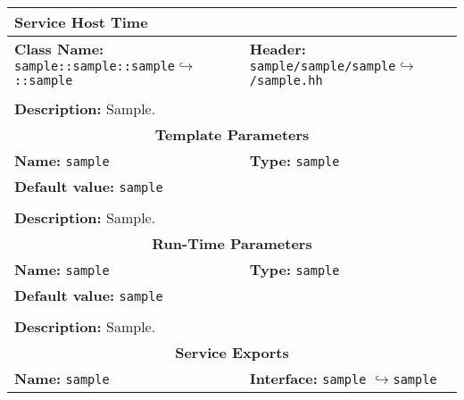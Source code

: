 \newpage
\begin{center}
	\begin{tabular}{|p{7.5cm}|p{7.5cm}|}
		\hline
		\multicolumn{2}{|l|}{\textbf{\Large Service Host Time}}\\
		\hline
		\multicolumn{1}{|p{7.5cm}}{\textbf{Class Name:} \newline \texttt{sample::sample::sample}\newline$\hookrightarrow$\texttt{::sample}} & \multicolumn{1}{p{7.5cm}|}{\textbf{Header:} \newline \texttt{sample/sample/sample}\newline$\hookrightarrow$\texttt{/sample.hh}}\\
		\multicolumn{2}{|l|}{}\\
		\multicolumn{2}{|p{15cm}|}{\textbf{Description:} \newline Sample.}\\
		\hline
		\hline
		\multicolumn{2}{|c|}{\textbf{\large Template Parameters}}\\
		\hline
		\multicolumn{1}{|p{7.5cm}}{\textbf{Name:} \texttt{sample}} & \multicolumn{1}{p{7.5cm}|}{\textbf{Type:} \texttt{sample}}\\
		\multicolumn{2}{|p{15cm}|}{\textbf{Default value:} \texttt{sample}}\\
		\multicolumn{2}{|l|}{}\\
		\multicolumn{2}{|p{15cm}|}{\textbf{Description:} \newline Sample.}\\
		\hline
		\hline
		\multicolumn{2}{|c|}{\textbf{\large Run-Time Parameters}}\\
		\hline
		\multicolumn{1}{|p{7.5cm}}{\textbf{Name:} \texttt{sample}} & \multicolumn{1}{p{7.5cm}|}{\textbf{Type:} \texttt{sample}}\\
		\multicolumn{2}{|p{15cm}|}{\textbf{Default value:} \texttt{sample}}\\
		\multicolumn{2}{|l|}{}\\
		\multicolumn{2}{|p{15cm}|}{\textbf{Description:} \newline Sample.}\\
		\hline
		\hline
		\multicolumn{2}{|c|}{\textbf{\large Service Exports}}\\
		\hline
		\multicolumn{1}{|p{7.5cm}}{\textbf{Name:} \texttt{sample}} & \multicolumn{1}{p{7.5cm}|}{\textbf{Interface:} \newline \texttt{sample} \newline$\hookrightarrow$\texttt{sample}}\\

\end{tabular}
\end{center}

